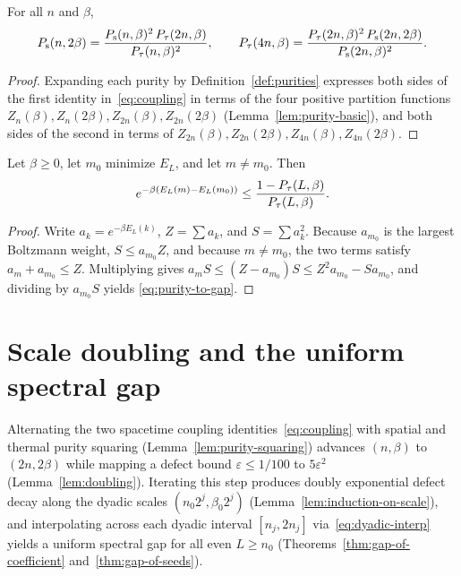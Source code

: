 \begin{lemma}
  \label{lem:coupling}
  \leanok
  For all \(n\) and \(\beta\),
  \begin{equation}
    \label{eq:coupling}
    P_{\mathrm{s}}(n, 2\beta) = \frac{P_{\mathrm{s}}(n, \beta)^2\, P_{\tau}(2n, \beta)}{P_{\tau}(n, \beta)^2},\qquad
    P_{\tau}(4n, \beta) = \frac{P_{\tau}(2n, \beta)^2\, P_{\mathrm{s}}(2n, 2\beta)}{P_{\mathrm{s}}(2n, \beta)^2}.
  \end{equation}
\end{lemma}
\begin{proof}
  \leanok
  Expanding each purity by Definition~\ref{def:purities} expresses both sides of the first identity
  in~\eqref{eq:coupling} in terms of the four positive partition functions
  \(Z_n(\beta), Z_n(2\beta), Z_{2n}(\beta), Z_{2n}(2\beta)\) (Lemma~\ref{lem:purity-basic}), and
  both sides of the second in terms of
  \(Z_{2n}(\beta), Z_{2n}(2\beta), Z_{4n}(\beta), Z_{4n}(2\beta)\).
\end{proof}

\begin{lemma}
  \label{lem:purity-to-gap}
  \leanok
  Let \(\beta \ge 0\), let \(m_0\) minimize \(E_L\), and let \(m \ne m_0\). Then
  \begin{equation}
    \label{eq:purity-to-gap}
    e^{-\beta (E_L(m) - E_L(m_0))} \le \frac{1 - P_{\tau}(L, \beta)}{P_{\tau}(L, \beta)}.
  \end{equation}
\end{lemma}
\begin{proof}
  \leanok
  Write \(a_k = e^{-\beta E_L(k)}\), \(Z = \sum a_k\), and \(S = \sum a_k^2\). Because \(a_{m_0}\)
  is the largest Boltzmann weight, \(S \le a_{m_0} Z\), and because \(m \ne m_0\), the two terms
  satisfy \(a_m + a_{m_0} \le Z\). Multiplying gives
  \(a_m S \le (Z - a_{m_0}) S \le Z^2 a_{m_0} - S a_{m_0}\), and dividing by \(a_{m_0} S\) yields
  \eqref{eq:purity-to-gap}.
\end{proof}

\section{Scale doubling and the uniform spectral gap}

Alternating the two spacetime coupling identities~\eqref{eq:coupling} with spatial and thermal
purity squaring (Lemma~\ref{lem:purity-squaring}) advances \((n, \beta)\) to \((2n, 2\beta)\) while
mapping a defect bound \(\varepsilon \le 1/100\) to \(5\varepsilon^2\) (Lemma~\ref{lem:doubling}).
Iterating this step produces doubly exponential defect decay along the dyadic scales
\((n_0 2^j, \beta_0 2^j)\) (Lemma~\ref{lem:induction-on-scale}), and interpolating across each
dyadic interval \([n_j, 2n_j]\) via~\eqref{eq:dyadic-interp} yields a uniform spectral gap for all
even \(L \ge n_0\) (Theorems~\ref{thm:gap-of-coefficient} and~\ref{thm:gap-of-seeds}).

